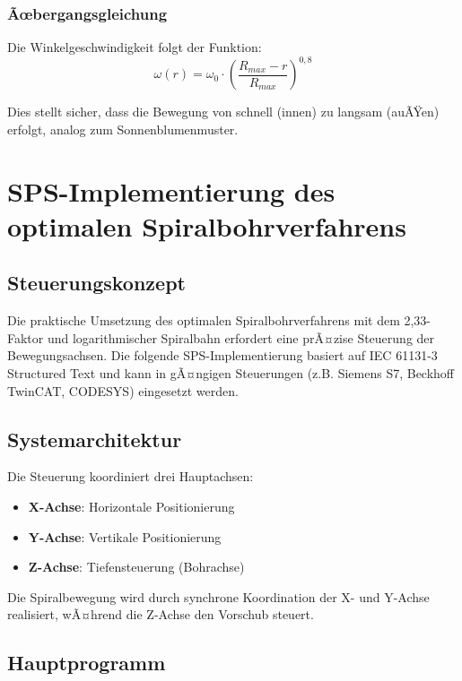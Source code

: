 ﻿\documentclass[12pt,a4paper]{article}
\begin{document}
\subsubsection{Ãœbergangsgleichung}
Die Winkelgeschwindigkeit folgt der Funktion:
\begin{equation}
	\omega(r) = \omega_0 \cdot \left(\frac{R_{max} - r}{R_{max}}\right)^{0{,}8}
\end{equation}

Dies stellt sicher, dass die Bewegung von schnell (innen) zu langsam (auÃŸen) erfolgt, analog zum Sonnenblumenmuster.

\section{SPS-Implementierung des optimalen Spiralbohrverfahrens}

\subsection{Steuerungskonzept}

Die praktische Umsetzung des optimalen Spiralbohrverfahrens mit dem 2,33-Faktor und logarithmischer Spiralbahn erfordert eine prÃ¤zise Steuerung der Bewegungsachsen. Die folgende SPS-Implementierung basiert auf IEC 61131-3 Structured Text und kann in gÃ¤ngigen Steuerungen (z.B. Siemens S7, Beckhoff TwinCAT, CODESYS) eingesetzt werden.

\subsection{Systemarchitektur}

Die Steuerung koordiniert drei Hauptachsen:
\begin{itemize}
	\item \textbf{X-Achse}: Horizontale Positionierung
	\item \textbf{Y-Achse}: Vertikale Positionierung
	\item \textbf{Z-Achse}: Tiefensteuerung (Bohrachse)
\end{itemize}

Die Spiralbewegung wird durch synchrone Koordination der X- und Y-Achse realisiert, wÃ¤hrend die Z-Achse den Vorschub steuert.

\subsection{Hauptprogramm}
\end{document}
